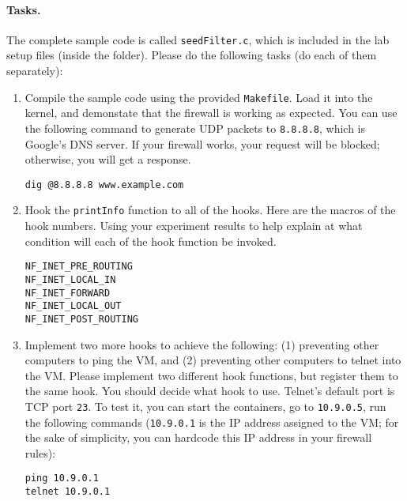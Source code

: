 \paragraph{Tasks.} The complete sample code is 
called \texttt{seedFilter.c}, which is included 
in the lab setup files (inside the 
folder). Please do the following tasks (do each of them
separately):

\begin{enumerate}
\item Compile the sample code using the provided \texttt{Makefile}. 
  Load it into the kernel, and demonstate that the firewall is working as expected. You can use
    the following command to generate UDP packets to \texttt{8.8.8.8}, which is Google's DNS
    server. If your firewall works, your request will be blocked; otherwise, you will get a
    response.

\begin{lstlisting}
dig @8.8.8.8 www.example.com 
\end{lstlisting}
     

\item Hook the \texttt{printInfo} function to all of the 
\netfilter hooks. Here are the macros of the hook numbers. 
Using your experiment results to help explain at what condition
will each of the hook function be invoked. 

\begin{lstlisting}
NF_INET_PRE_ROUTING 
NF_INET_LOCAL_IN        
NF_INET_FORWARD 
NF_INET_LOCAL_OUT 
NF_INET_POST_ROUTING    
\end{lstlisting}


\item Implement two more hooks to achieve the following:
(1) preventing other computers to ping the VM, and
(2) preventing other computers to telnet into the VM. 
Please implement two different hook functions, but register them
to the same \netfilter hook. You should decide what hook to use.
Telnet's default port is TCP port \texttt{23}. To test it, you can
start the containers, go to \texttt{10.9.0.5}, run the 
following commands (\texttt{10.9.0.1} is the IP address assigned
to the VM; for the sake of simplicity, you can hardcode this IP
address in your firewall rules):
 
\begin{lstlisting}
ping 10.9.0.1
telnet 10.9.0.1
\end{lstlisting}
     
\end{enumerate}
 

